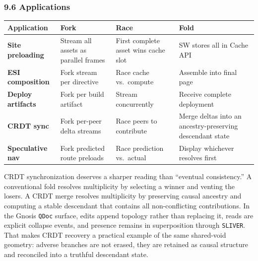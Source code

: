 \documentclass[
  11pt,
]{article}
\newcounter{none} %
\begin{document}
\subsubsection{9.6 Applications}\label{applications}

{\def\LTcaptype{none} %
\begin{longtable}[]{@{}
  >{\raggedright\arraybackslash}p{}
  >{\raggedright\arraybackslash}p{}
  >{\raggedright\arraybackslash}p{}
  >{\raggedright\arraybackslash}p{}@{}}
\toprule\noalign{}
\begin{minipage}[b]{\linewidth}\raggedright
Application
\end{minipage} & \begin{minipage}[b]{\linewidth}\raggedright
Fork
\end{minipage} & \begin{minipage}[b]{\linewidth}\raggedright
Race
\end{minipage} & \begin{minipage}[b]{\linewidth}\raggedright
Fold
\end{minipage} \\
\midrule\noalign{}
\endhead
\bottomrule\noalign{}
\endlastfoot
\textbf{Site preloading} & Stream all assets as parallel frames & First
complete asset wins cache slot & SW stores all in Cache API \\
\textbf{ESI composition} & Fork stream per directive & Race cache
vs.~compute & Assemble into final page \\
\textbf{Deploy artifacts} & Fork per build artifact & Stream
concurrently & Receive complete deployment \\
\textbf{CRDT sync} & Fork per-peer delta streams & Race peers to
contribute & Merge deltas into an ancestry-preserving descendant
state \\
\textbf{Speculative nav} & Fork predicted route preloads & Race
prediction vs.~actual & Display whichever resolves first \\
\end{longtable}
}

CRDT synchronization deserves a sharper reading than ``eventual
consistency.'' A conventional fold resolves multiplicity by selecting a
winner and venting the losers. A CRDT merge resolves multiplicity by
preserving causal ancestry and computing a stable descendant that
contains all non-conflicting contributions. In the Gnosis \texttt{QDoc}
surface, edits append topology rather than replacing it, reads are
explicit collapse events, and presence remains in superposition through
\texttt{SLIVER}. That makes CRDT recovery a practical example of the
same shared-void geometry: adverse branches are not erased, they are
retained as causal structure and reconciled into a truthful descendant
state.
\end{document}
